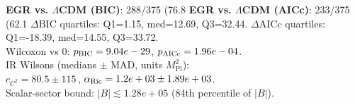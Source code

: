 \textbf{EGR vs. $\Lambda$CDM (BIC)}: 288/375 (76.8%
\textbf{EGR vs. $\Lambda$CDM (AICc)}: 233/375 (62.1%
$\Delta\mathrm{BIC}$ quartiles: Q1=1.15, med=12.69, Q3=32.44.\quad
$\Delta\mathrm{AICc}$ quartiles: Q1=-18.39, med=14.55, Q3=33.72.\\
Wilcoxon vs 0: $p_{\rm BIC}=9.04e-29$, $p_{\rm AICc}=1.96e-04$.\\[4pt]
IR Wilsons (medians $\pm$ MAD, units $M_\mathrm{Pl}^2$):\\
$c_{C^2} = 80.5 \pm 115$\,,\qquad
$\alpha_{\rm Ric} = 1.2e+03 \pm 1.89e+03$.\\
Scalar-sector bound: $|B| \lesssim 1.28e+05$ (84th percentile of $|B|$).